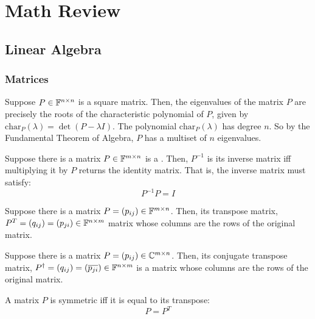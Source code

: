 \chapter{Math Review}

\section{Linear Algebra}
\subsection{Matrices}
\begin{definition}[Eigenvalue]
Suppose $P \in \mathbb{F}^{n \times n}$ is a square matrix. Then, the eigenvalues of the matrix $P$ are precisely the roots of the characteristic polynomial of $P$, given by $\text{char}_P(\lambda) = \det(P - \lambda I)$. The polynomial $\text{char}_P(\lambda)$ has degree $n$. So by the Fundamental Theorem of Algebra, $P$ has a multiset of $n$ eigenvalues.
\end{definition}


\begin{definition}
Suppose there is a matrix $P \in \mathbb{F}^{m\times n}$ is a . Then, $P^{-1}$ is its inverse matrix iff multiplying it by $P$ returns the identity matrix. That is, the inverse matrix must satisfy:
$$ P^{-1} P = I$$ 
\end{definition}

\begin{definition}
Suppose there is a matrix $P = (p_{ij}) \in \mathbb{F}^{m\times n}$. Then, its transpose matrix, $P^{T} = (q_{ij}) = (p_{ji}) \in \mathbb{F}^{n\times m}$ matrix whose columns are the rows of the original matrix.
\end{definition}

\begin{definition}
Suppose there is a matrix $P = (p_{ij}) \in \mathbb{C}^{m\times n}$. Then, its conjugate transpose matrix, $P^{\dagger} = (q_{ij}) = (\overline{p_{ji}}) \in \mathbb{F}^{n\times m}$ is a matrix whose columns are the rows of the original matrix.
\end{definition}

\begin{definition}
A matrix $P$ is symmetric iff it is equal to its transpose:
$$ P = P^{T}$$
\end{definition}


